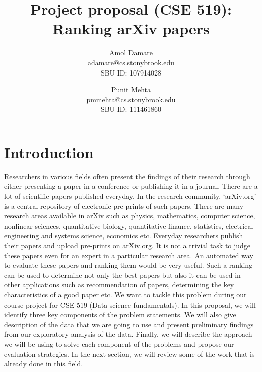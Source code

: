 \documentclass[a4paper, 11pt]{article}
\begin{document}
\title{Project proposal (CSE 519): Ranking arXiv papers}

\author{Amol Damare \\ adamare@cs.stonybrook.edu \\SBU ID: 107914028
\and
Punit Mehta \\  pmmehta@cs.stonybrook.edu \\SBU ID: 111461860}
\maketitle
\section{Introduction}
Researchers in various fields often present the findings of their research through either presenting a paper in a conference or publishing it in a journal. There are a lot of scientific papers published everyday. In the research community, `arXiv.org' is a central repository of electronic pre-prints of such papers. There are many research areas available in arXiv such as physics, mathematics, computer science, nonlinear sciences, quantitative biology, quantitative finance, statistics, electrical engineering and systems science, economics etc.  Everyday researchers publish their papers and upload pre-prints on arXiv.org.  It is not a trivial task to judge these papers even for an expert in a particular research area. An automated way to evaluate these papers and ranking them would be very useful. Such a ranking can be used to determine not only the best papers but also it can be used in other applications such as recommendation of papers, determining the key characteristics of a good paper etc. We want to tackle this problem during our course project for CSE 519 (Data science fundamentals). In this proposal, we will identify three key components of the problem statements. We will also give description of the data that we are going to use and present preliminary findings from our exploratory analysis of the data.  Finally, we will describe the approach we will be using to solve each component of the problems and propose our evaluation strategies. In the next section, we will review some of the work that is already done in this field.
\end{document}
